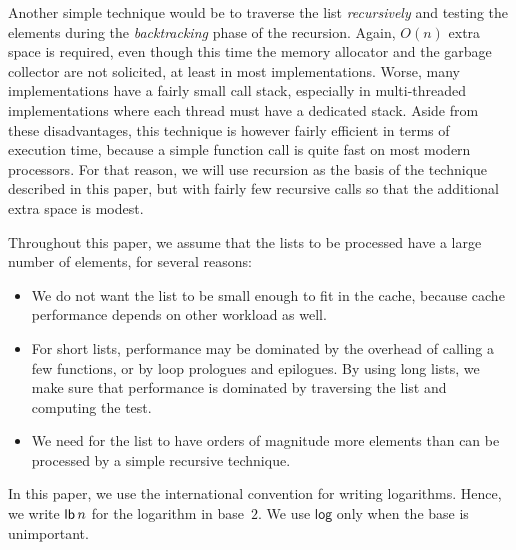 Another simple technique would be to traverse the list \emph{recursively}
and testing the elements during the \emph{backtracking} phase of the
recursion.  Again, $O(n)$ extra space is required, even though this
time the memory allocator and the garbage collector are not solicited,
at least in most implementations.  Worse, many implementations have a
fairly small call stack, especially in multi-threaded implementations
where each thread must have a dedicated stack.  Aside from these
disadvantages, this technique is however fairly efficient in terms of
execution time, because a simple function call is quite fast on most
modern processors.  For that reason, we will use recursion as the
basis of the technique described in this paper, but with fairly few
recursive calls so that the additional extra space is modest.

Throughout this paper, we assume that the lists to be processed have a
large number of elements, for several reasons:

\begin{itemize}
\item We do not want the list to be small enough to fit in the cache,
  because cache performance depends on other workload as well.
\item For short lists, performance may be dominated by the overhead of
  calling a few functions, or by loop prologues and epilogues.  By
  using long lists, we make sure that performance is dominated by
  traversing the list and computing the test.
\item We need for the list to have orders of magnitude more elements
  than can be processed by a simple recursive technique.
\end{itemize}

In this paper, we use the international convention for writing
logarithms.  Hence, we write $\mathsf{lb}\thinspace n$ for the
logarithm in base~$2$.  We use $\mathsf{log}$ only when the base is
unimportant.

